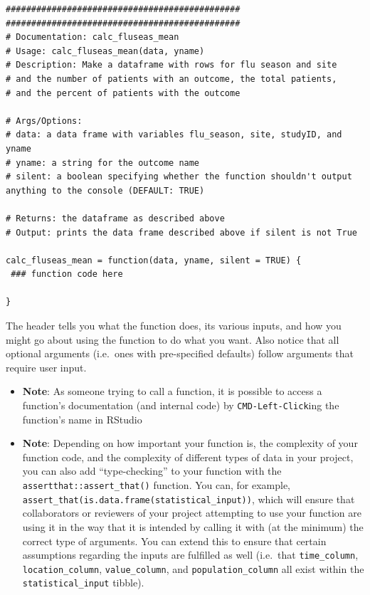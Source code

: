 \documentclass[]{book}
\begin{document}
\begin{verbatim}
##############################################
##############################################
# Documentation: calc_fluseas_mean
# Usage: calc_fluseas_mean(data, yname)
# Description: Make a dataframe with rows for flu season and site
# and the number of patients with an outcome, the total patients,
# and the percent of patients with the outcome

# Args/Options:
# data: a data frame with variables flu_season, site, studyID, and yname
# yname: a string for the outcome name
# silent: a boolean specifying whether the function shouldn't output anything to the console (DEFAULT: TRUE)

# Returns: the dataframe as described above
# Output: prints the data frame described above if silent is not True

calc_fluseas_mean = function(data, yname, silent = TRUE) {
 ### function code here 

}
\end{verbatim}

The header tells you what the function does, its various inputs, and how
you might go about using the function to do what you want. Also notice
that all optional arguments (i.e.~ones with pre-specified defaults)
follow arguments that require user input.

\begin{itemize}
\item
  \textbf{Note}: As someone trying to call a function, it is possible to
  access a function's documentation (and internal code) by
  \texttt{CMD-Left-Click}ing the function's name in RStudio
\item
  \textbf{Note}: Depending on how important your function is, the
  complexity of your function code, and the complexity of different
  types of data in your project, you can also add ``type-checking'' to
  your function with the \texttt{assertthat::assert\_that()} function.
  You can, for example,
  \texttt{assert\_that(is.data.frame(statistical\_input))}, which will
  ensure that collaborators or reviewers of your project attempting to
  use your function are using it in the way that it is intended by
  calling it with (at the minimum) the correct type of arguments. You
  can extend this to ensure that certain assumptions regarding the
  inputs are fulfilled as well (i.e.~that \texttt{time\_column},
  \texttt{location\_column}, \texttt{value\_column}, and
  \texttt{population\_column} all exist within the
  \texttt{statistical\_input} tibble).
\end{itemize}
\end{document}
